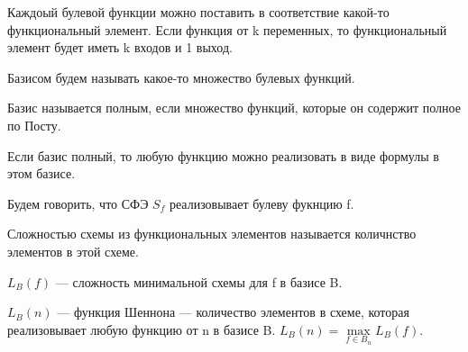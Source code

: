 Каждоый булевой функции можно поставить в соответствие какой-то функциональный
элемент. Если функция от k переменных, то функциональный элемент будет иметь k
входов и 1 выход.

Базисом будем называть какое-то множество булевых функций.
\begin{definition}
	Базис называется полным, если множество функций, которые он содержит
	полное по Посту.
\end{definition}

Если базис полный, то любую функцию можно реализовать в виде формулы в этом
базисе. 

Будем говорить, что СФЭ $S_f$ реализовывает булеву фукнцию f.

\begin{definintion}
	Сложностью схемы из функциональных элементов называется количнство
	элементов в этой схеме.
\end{definintion}

$L_B(f)$ --- сложность минимальной схемы для f в базисе B.

$L_B(n)$ --- функция Шеннона --- количество элементов в схеме, которая
реализовывает любую функцию от n в базисе B.  $L_B(n) = \max\limits_{f\in
B_n}L_B(f) $.

